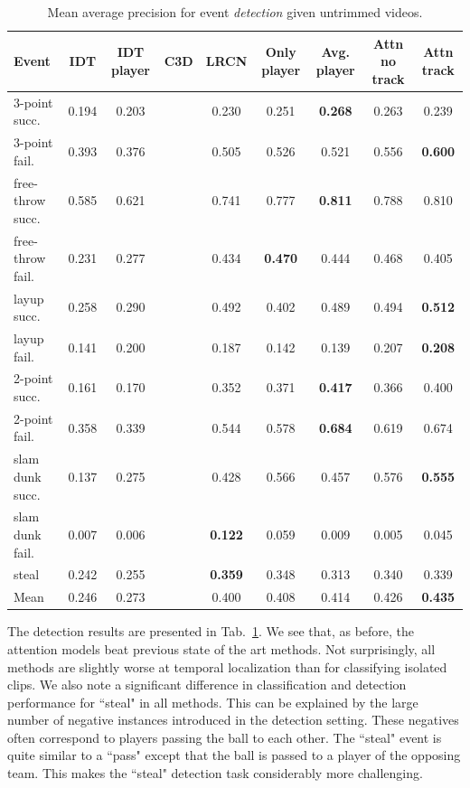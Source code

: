 \begin{table}[ht!]
\begin{center}
\small
 \begin{tabular}{|l|c|c|c|c|c|c|c|c|}
  \hline
Event & IDT\cite{Wang_CVPR11} & IDT player\cite{Wang_CVPR11} & C3D \cite{Tran_arxiv14} & LRCN \cite{Donahue_arxiv14} & Only player & Avg. player & Attn no track & Attn track \\ \hline \hline
3-point succ.    & 0.194  & 0.203 &  & 0.230 & 0.251 & \textbf{0.268} & 0.263 & 0.239 \\
3-point fail.    & 0.393  & 0.376 &  & 0.505 & 0.526 & 0.521 & 0.556 & \textbf{0.600} \\
free-throw succ. & 0.585  & 0.621 &  & 0.741 & 0.777 & \textbf{0.811} & 0.788 & 0.810 \\
free-throw fail. & 0.231  & 0.277 &  & 0.434 & \textbf{0.470} & 0.444 & 0.468 & 0.405 \\
layup succ.      & 0.258  & 0.290 &  & 0.492 & 0.402 & 0.489 & 0.494 & \textbf{0.512} \\
layup fail.      & 0.141  & 0.200 &  & 0.187 & 0.142 & 0.139 & 0.207 & \textbf{0.208} \\
2-point succ.    & 0.161  & 0.170 &  & 0.352 & 0.371 & \textbf{0.417} & 0.366 & 0.400 \\
2-point fail.    & 0.358  & 0.339 &  & 0.544 & 0.578 & \textbf{0.684} & 0.619 & 0.674 \\
  slam dunk succ.& 0.137  & 0.275 &  & 0.428 & 0.566 & 0.457 & 0.576 & \textbf{0.555} \\
slam dunk fail.  & 0.007  & 0.006 &  & \textbf{0.122} & 0.059 & 0.009 & 0.005 & 0.045 \\
steal            & 0.242  & 0.255 &  & \textbf{0.359} & 0.348 & 0.313 & 0.340 & 0.339 \\ \hline \hline
Mean             & 0.246  & 0.273 &  & 0.400 & 0.408 & 0.414 & 0.426 & \textbf{0.435} \\ \hline
  \end{tabular}
\end{center}
  \caption{Mean average precision for event {\em detection} given
    untrimmed videos.}
  \label{tab:detection_res}
\end{table}

The detection results are presented in Tab.~\ref{tab:detection_res}.  We see
that, as before, the attention models beat previous state of the art methods.
Not surprisingly, all methods are slightly worse at temporal localization than
for classifying isolated clips.  We also note a significant
difference in classification and detection performance for ``steal" in all
methods.  This can be explained by the large number of negative instances
introduced in the detection setting. These negatives often correspond to
players passing the ball to each other. The ``steal" event is quite similar to
a ``pass" except that the ball is passed to a player of the opposing team. This
makes the ``steal" detection task considerably more challenging.


